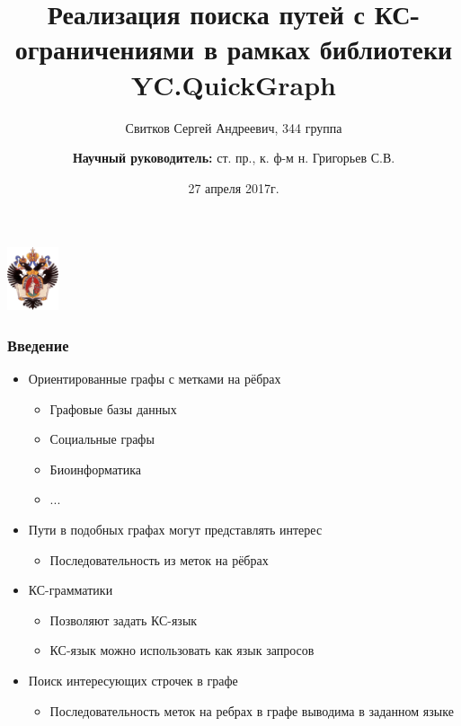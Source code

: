 \documentclass{beamer}
\title[]{Реализация поиска путей с КС-ограничениями в рамках библиотеки YC.QuickGraph}
\institute[СПбГУ]{
Санкт-Петербургский государственный университет \\
Кафедра системного программирования }
\author[Свитков Сергей]{Свитков Сергей Андреевич, 344 группа \\
  \and  
    {\bfseries Научный руководитель:} ст. пр., к. ф-м н. Григорьев С.В. \\ }
\date{27 апреля 2017г.}
\begin{document}
{
\begin{frame}
  \begin{center}
  {\includegraphics[width=1.5cm]{pictures/SPbGU_Logo.png}}
  \end{center}
  \titlepage
\end{frame}
}

\begin{frame}[fragile]
  \transwipe[direction=90]
  \frametitle{Введение}
  \begin{itemize}
    \item Ориентированные графы с метками на рёбрах
    \begin{itemize}
        \item Графовые базы данных
        \item Социальные графы
        \item Биоинформатика
        \item ...
    \end{itemize}
    \item Пути в подобных графах могут представлять интерес
    \begin{itemize}
        \item Последовательность из меток на рёбрах
    \end{itemize}
    \item КС-грамматики
    \begin{itemize}
        \item Позволяют задать КС-язык
        \item КС-язык можно использовать как язык запросов
    \end{itemize}
    \item Поиск интересующих строчек в графе
    \begin{itemize}
        \item Последовательность меток на ребрах в графе выводима в заданном языке
    \end{itemize}
  \end{itemize}
\end{frame}
            
\end{document}
